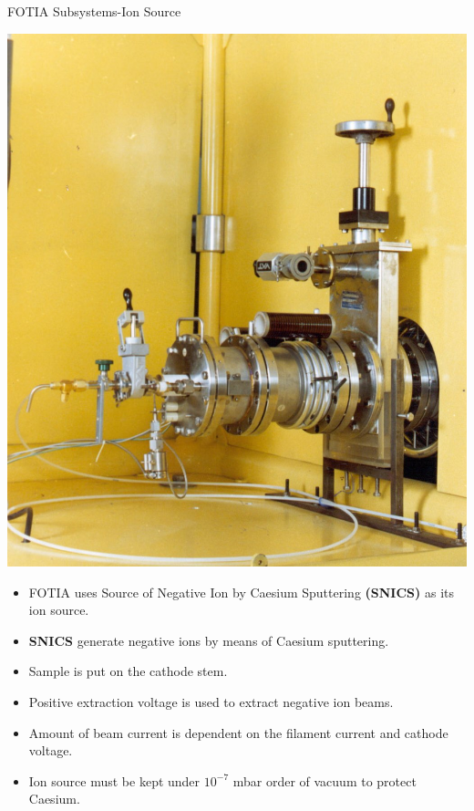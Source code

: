 \documentclass[11pt]{beamer}
\begin{document}
\begin{frame}{FOTIA Subsystems-Ion Source}

   \begin{center}
    \includegraphics[scale=0.1]{SNICS.jpg}
   \end{center}
  
  
  
  
  
  \begin{itemize}
   
    \item FOTIA uses Source of Negative Ion by Caesium Sputtering \textbf{(SNICS)} as its ion source.
    \item \textbf{SNICS} generate negative ions by means of Caesium sputtering.
    \item Sample is put on the cathode stem.
    \item Positive extraction voltage is used to extract negative ion beams.
    \item Amount of beam current is dependent on the filament current and cathode voltage.
    \item Ion source must be kept under $10^{-7}$ mbar order of vacuum to protect Caesium.
   
   \end{itemize}

\end{frame}
\end{document}
